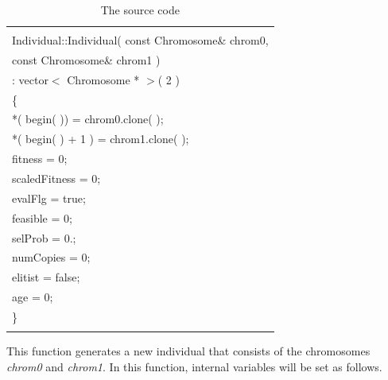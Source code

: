 \documentclass[twocolumn]{article}
\begin{document}
\begin{table}[h]
\begin{center}
\caption{The source code}
\label{SC5}
{\scriptsize
\begin{tabular}{|l|}\hline
\hspace*{7cm}\\
Individual::Individual( const Chromosome\& chrom0, \\
\hspace*{4mm} const Chromosome\& chrom1 )\\
\hspace*{4mm} : vector$<$ Chromosome * $>$( 2 )\\
\{\\
\hspace*{4mm} *( begin( )) = chrom0.clone( );\\
\hspace*{4mm} *( begin( ) + 1 ) = chrom1.clone( );\\
\hspace*{4mm} fitness = 0;\\
\hspace*{4mm} scaledFitness = 0;\\
\hspace*{4mm} evalFlg = true;\\
\hspace*{4mm} feasible = 0;\\
\hspace*{4mm} selProb = 0.;\\
\hspace*{4mm} numCopies = 0;\\
\hspace*{4mm} elitist = false;\\
\hspace*{4mm} age = 0;\\
\}\\
\hspace*{7cm}\\\hline
\end{tabular}
}
\end{center}
\end{table}

\noindent
This function generates a new individual that consists of the
chromosomes {\em chrom0} and {\em chrom1}. In this function, internal
variables will be set as follows.
\end{document}

